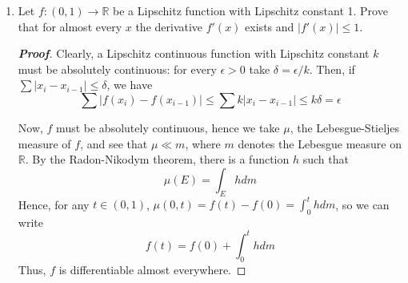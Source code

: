 \documentclass[12pt,leqno]{book}
\theoremstyle{definition}
\newcommand{\R}{\mathbb{R}}
\newenvironment{Proof}{\begin{proof}[\textnormal{\textbf{Proof}}]}{\end{proof}}
\begin{document}
\begin{enumerate}
\item Let $f:(0,1)\to\R$ be a Lipschitz function with Lipschitz constant 1. Prove that for almost every $x$ the derivative $f'(x)$ exists and $|f'(x)|\leq1$.

\begin{Proof}
 Clearly, a Lipschitz continuous function with Lipschitz constant $k$ must be absolutely continuous: for every $\epsilon>0$ take $\delta=\epsilon/k$. Then, if $\sum|x_i-x_{i-1}|\leq\delta$, we have \[\sum|f(x_i)-f(x_{i-1})|\leq\sum k|x_i-x_{i-1}|\leq k\delta=\epsilon\]

 Now, $f$ must be absolutely continuous, hence we take $\mu$, the Lebesgue-Stieljes measure of $f$, and see that $\mu\ll m$, where $m$ denotes the Lebesgue measure on $\R$. By the Radon-Nikodym theorem, there is a function $h$ such that \[\mu(E)=\int_Ehdm\] Hence, for any $t\in(0,1)$, $\mu(0,t)=f(t)-f(0)=\int_0^thdm$, so we can write \[f(t)=f(0)+\int_0^thdm\] Thus, $f$ is differentiable almost everywhere.
\end{Proof}

\end{enumerate}
\end{document}
